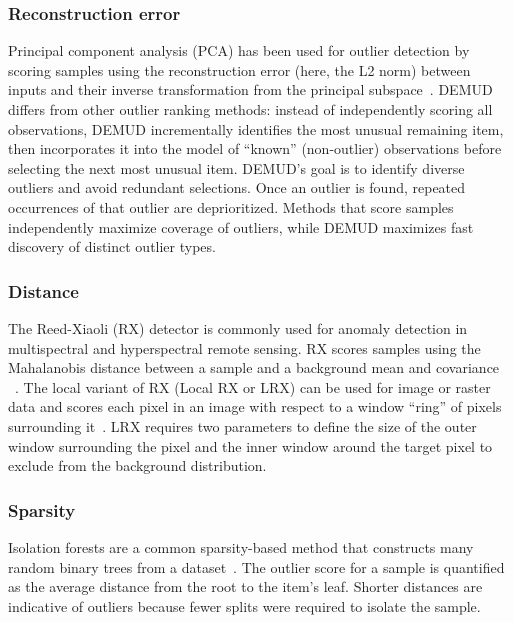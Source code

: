 \documentclass[utf8]{frontiersFPHY} %
\begin{document}
\subsubsection{Reconstruction error}
Principal component analysis (PCA) has been used for outlier detection by
scoring samples using the reconstruction error (here, the L2 norm)
between inputs and their inverse
transformation from the principal subspace~\citep{kerner2020comparison}.
DEMUD~\citep{wagstaff:demud13} differs from other
outlier ranking methods: instead of independently scoring all
observations, DEMUD incrementally identifies the most unusual
remaining item, then incorporates it into the model of ``known''
(non-outlier) observations before selecting the next most unusual
item.  DEMUD's goal is to identify diverse outliers and avoid
redundant selections.  Once an outlier is found, repeated
occurrences of that outlier are deprioritized.  Methods that score
samples independently maximize coverage of outliers, while DEMUD
maximizes fast discovery of distinct outlier types.

\subsubsection{Distance}
The 
Reed-Xiaoli (RX) detector is commonly used for anomaly detection in
multispectral and hyperspectral remote sensing. RX scores samples using
the Mahalanobis
distance between a sample and a background mean and covariance
~\citep{reed1990adaptive}. The local variant of RX (Local
RX or LRX) can be used for image or raster data and scores each pixel in
an image with respect to a window ``ring'' of pixels surrounding 
it~\citep{molero2013analysis}. 
LRX requires two parameters to define the size of the outer window 
surrounding the pixel and the inner window
around the target pixel to exclude from the background distribution. 

\subsubsection{Sparsity}
Isolation forests are a common sparsity-based method
that constructs many random binary trees from a 
dataset~\cite{liu2008isolation}. The outlier score for
a sample is quantified as the average distance from the root to the item’s 
leaf. Shorter distances are indicative of outliers because fewer splits were 
required to isolate the sample.
\end{document}
